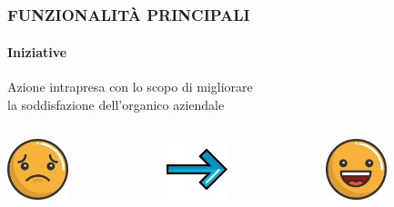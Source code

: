 \documentclass[hyperref={pdfpagemode=FullScreen},aspectratio=169]{beamer}
\begin{document}
\section{}
\begin{frame}
\frametitle{FUNZIONALITÀ PRINCIPALI}
\framesubtitle{Iniziative}
\vspace{-30pt}
\begin{center}
\begin{Large}
Azione intrapresa con lo scopo di migliorare \\ la soddisfazione dell'organico aziendale
\end{Large}
\end{center}
\begin{columns}[T] %
     
     \begin{column}[T]{5cm} %
     \begin{flushright}
     \includegraphics[height=50pt]{images/sad}
     \end{flushright}
     \end{column}
     
     \begin{column}[T]{5cm} %
     \begin{center}
     \includegraphics[height=50pt]{images/arrow}
     \end{center}
     \end{column}
     
     \begin{column}[T]{5cm} %
     \begin{flushleft}
     \includegraphics[height=50pt]{images/happy}
     \end{flushleft}
     \end{column}
     
\end{columns}

\end{frame}
\end{document}
